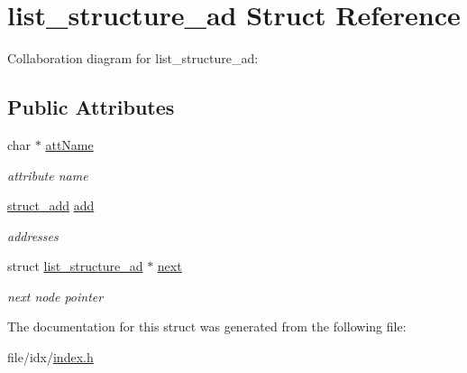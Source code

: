 \hypertarget{structlist__structure__ad}{\section{list\+\_\+structure\+\_\+ad Struct Reference}
\label{structlist__structure__ad}
}


Collaboration diagram for list\+\_\+structure\+\_\+ad\+:
\subsection*{Public Attributes}
\begin{DoxyCompactItemize}
\item 
\hypertarget{structlist__structure__ad_a62a7324920a37f1388600ab02c0fd841}{char $\ast$ \hyperlink{structlist__structure__ad_a62a7324920a37f1388600ab02c0fd841}{att\+Name}}\label{structlist__structure__ad_a62a7324920a37f1388600ab02c0fd841}

\begin{DoxyCompactList}\small\item\em attribute name \end{DoxyCompactList}\item 
\hypertarget{structlist__structure__ad_a0bb6169985f5e52444aa344508cce673}{\hyperlink{structstruct__add}{struct\+\_\+add} \hyperlink{structlist__structure__ad_a0bb6169985f5e52444aa344508cce673}{add}}\label{structlist__structure__ad_a0bb6169985f5e52444aa344508cce673}

\begin{DoxyCompactList}\small\item\em addresses \end{DoxyCompactList}\item 
\hypertarget{structlist__structure__ad_a5c8aaf39dab4c40186470c6ea0464a23}{struct \hyperlink{structlist__structure__ad}{list\+\_\+structure\+\_\+ad} $\ast$ \hyperlink{structlist__structure__ad_a5c8aaf39dab4c40186470c6ea0464a23}{next}}\label{structlist__structure__ad_a5c8aaf39dab4c40186470c6ea0464a23}

\begin{DoxyCompactList}\small\item\em next node pointer \end{DoxyCompactList}\end{DoxyCompactItemize}


The documentation for this struct was generated from the following file\+:\begin{DoxyCompactItemize}
\item 
file/idx/\hyperlink{index_8h}{index.\+h}\end{DoxyCompactItemize}
